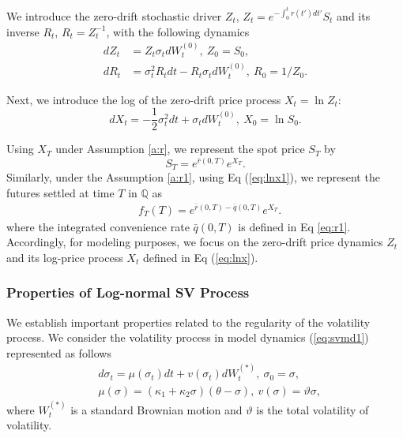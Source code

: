 \documentclass[11pt,a4paper] {article}
\begin{document}
We introduce the zero-drift stochastic driver $Z_t$, $Z_t = e^{ - \int^{t}_{0}r(t') dt'}S_{t}$ and its inverse $R_t$, $R_t = Z^{-1}_{t}$, with the following dynamics
\begin{equation} \label{eq:zr}
\begin{split}
dZ_{t}&= Z_t\sigma_{t}dW^{(0)}_{t}, \ Z_0 =S_{0},\\
dR_{t}&= \sigma^{2}_{t}R_{t}dt-R_{t}\sigma_{t}dW^{(0)}_{t}, \ R_{0} =1/Z_{0}.
\end{split}
\end{equation}

Next, we introduce the log of the zero-drift price process $X_t = \ln Z_t$:
\begin{equation} \label{eq:lnx}
dX_{t}= -\frac{1}{2}\sigma^{2}_{t}dt+\sigma_{t}dW^{(0)}_{t}, \ X_{0} =\ln S_{0}.
\end{equation}


Using $X_{T}$ under Assumption \ref{a:r}, we represent the spot price $S_{T}$ by
\begin{equation} \label{eq:lnx1}
S_{T} = e^{\bar{r}(0, T)} e^{X_{T}}.
\end{equation}
Similarly, under the Assumption \ref{a:r1}, using Eq (\ref{eq:lnx1}), we represent the futures settled at time $T$ in $\mathbb{Q}$ as
\begin{equation} \label {eq:qt}
\begin{split}
& f_{T}(T) = e^{\bar{r}(0, T)-\bar{q}(0, T)} e^{X_{T}}.
\end{split}
\end{equation}
where the integrated convenience rate $\bar{q}(0, T)$ is defined in Eq \eqref{eq:r1}. Accordingly, for modeling purposes, we focus on the zero-drift price dynamics $Z_{t}$ and its log-price process $X_{t}$ defined in Eq (\ref{eq:lnx}). 


\subsubsection{Properties of Log-normal SV Process}\label{sec:vol_process}

We establish important properties related to the regularity of the volatility process. We consider the volatility process in model dynamics (\ref{eq:svmd1}) represented as follows
\begin{equation} \label{eq:pm1}
\begin{split}
& d\sigma_{t} =\mu(\sigma_{t})dt + v(\sigma_{t}) dW^{(*)}_{t}, \ \sigma_{0}=\sigma,\\
& \mu(\sigma)=\left(\kappa_{1} + \kappa_{2}\sigma \right)(\theta - \sigma), \  v(\sigma)  =\vartheta \sigma,
\end{split}
\end{equation}
where $W^{(*)}_{t}$ is a standard Brownian motion and $\vartheta$ is the total volatility of volatility.
\end{document}
